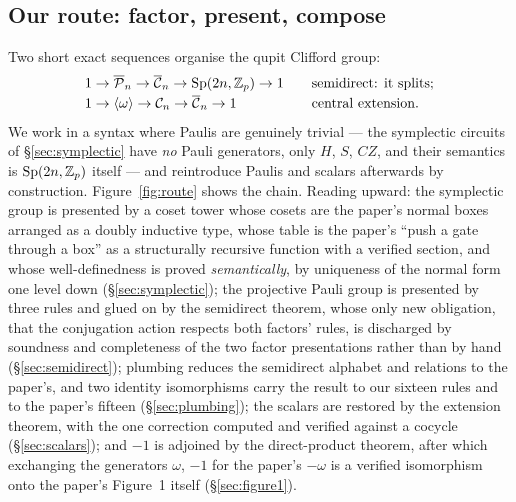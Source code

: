 \subsection{Our route: factor, present, compose}\label{sec:ourroute}

Two short exact sequences organise the qupit Clifford group:
\[
  \begin{array}{l@{\qquad}l}
  1 \to \PPauli \to \PCliff \to \Sp \to 1 & \text{semidirect: it splits;}\\[2pt]
  1 \to \langle\omega\rangle \to \Cliff \to \PCliff \to 1 & \text{central extension.}
  \end{array}
\]
We work in a syntax where Paulis are genuinely trivial --- the
symplectic circuits of \S\ref{sec:symplectic} have \emph{no} Pauli
generators, only $H$, $S$, $CZ$, and their semantics is $\mathrm{Sp}(2n,\mathbb{Z}_p)$ itself ---
and reintroduce Paulis and scalars afterwards by construction.
Figure~\ref{fig:route} shows the chain.  Reading upward: the symplectic
group is presented by a coset tower whose cosets are the paper's normal
boxes arranged as a doubly inductive type, whose table is the paper's
``push a gate through a box'' as a structurally recursive function with
a verified section, and whose well-definedness is proved
\emph{semantically}, by uniqueness of the normal form one level down
(\S\ref{sec:symplectic}); the projective Pauli group is presented by
three rules and glued on by the semidirect theorem, whose only new
obligation, that the conjugation action respects both factors' rules, is
discharged by soundness and completeness of the two factor presentations
rather than by hand (\S\ref{sec:semidirect}); plumbing reduces the
semidirect alphabet and relations to the paper's, and two identity
isomorphisms carry the result to our sixteen rules and to the paper's
fifteen (\S\ref{sec:plumbing}); the scalars are restored by the
extension theorem, with the one correction computed and verified against
a cocycle (\S\ref{sec:scalars}); and $-1$ is adjoined by the
direct-product theorem, after which exchanging the generators $\omega$,
$-1$ for the paper's $-\omega$ is a verified isomorphism onto the
paper's Figure~1 itself (\S\ref{sec:figure1}).

